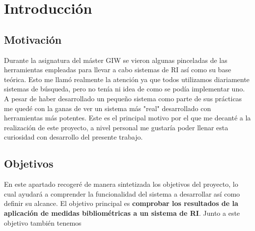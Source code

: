 \chapter{Introducción}
\section{Motivación}


Durante la asignatura del máster \acrfull{GIW} se vieron algunas pinceladas de las herramientas empleadas para llevar a cabo sistemas de \acrfull{RI} así como su base teórica. Esto me llamó realmente la atención ya que todos utilizamos diariamente sistemas de búsqueda, pero no tenía ni idea de como se podía implementar uno. A pesar de haber desarrollado un pequeño sistema como parte de sus prácticas me quedé con la ganas de ver un sistema más "real" desarrollado con herramientas más potentes. Este es el principal motivo por el que me decanté a la realización de este proyecto, a nivel personal me gustaría poder llenar esta curiosidad con desarrollo del presente trabajo.

\section{Objetivos}

En este apartado recogeré de manera sintetizada los objetivos del proyecto, lo cual ayudará a comprender la funcionalidad del sistema a desarrollar así como definir su alcance. El objetivo principal es \textbf{comprobar los resultados de la aplicación de medidas bibliométricas a un sistema de \acrfull{RI}}. Junto a este objetivo también tenemos 

